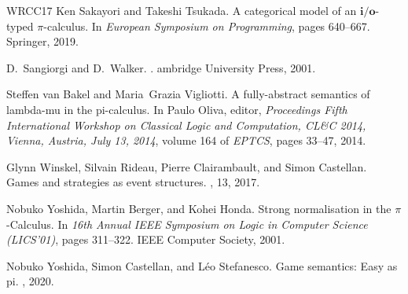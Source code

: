 \documentclass[11pt,a4paper]{amsart}
\theoremstyle{plain}
\theoremstyle{definition}
\theoremstyle{defC}
\theoremstyle{thmC}
\theoremstyle{plain}
\numberwithin{equation}{section}
\newcommand{\Intp}{\mbox{I$\pi$}\xspace}   %
\newcommand{\piI}{\Intp}   %
\theoremstyle{plain}
\theoremstyle{definition}
\begin{document}
\begin{thebibliography}{WRCC17}
Ken Sakayori and Takeshi Tsukada.
\newblock A categorical model of an $\mathbf{i/o}$-typed $\pi$-calculus.
\newblock In {\em European Symposium on Programming}, pages 640--667. Springer,
  2019.

D.~Sangiorgi and D.~Walker.
.
ambridge {U}niversity {P}ress, 2001.

Steffen van Bakel and Maria~Grazia Vigliotti.
\newblock A fully-abstract semantics of lambda-mu in the pi-calculus.
\newblock In Paulo Oliva, editor, {\em Proceedings Fifth International Workshop
  on Classical Logic and Computation, CL{\&}C 2014, Vienna, Austria, July 13,
  2014}, volume 164 of {\em {EPTCS}}, pages 33--47, 2014.

Glynn Winskel, Silvain Rideau, Pierre Clairambault, and Simon Castellan.
\newblock Games and strategies as event structures.
, 13, 2017.

Nobuko Yoshida, Martin Berger, and Kohei Honda.
\newblock Strong normalisation in the {{$\pi$}-Calculus}.
\newblock In {\em 16th Annual {IEEE} Symposium on Logic in Computer Science
  ({LICS}'01)}, pages 311--322. IEEE Computer Society, 2001.

Nobuko Yoshida, Simon Castellan, and L{\'e}o Stefanesco.
\newblock Game semantics: Easy as pi.
, 2020.

\end{thebibliography}


\appendix
\newpage









              





\end{document}

